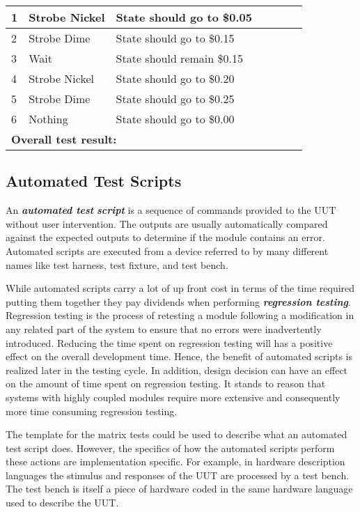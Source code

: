 \begin{table}[h]
\begin{tabular}{|m{1cm}|m{2cm}|m{2cm}|m{0.5cm}|m{0.5cm}|m{0.5cm}|m{2cm}|m{2cm}|}
1 & Strobe Nickel & State should go to \$0.05 & & & & \multicolumn{2}{l|}{} \\ \hline
2 & Strobe Dime & State should go to \$0.15 & & & & \multicolumn{2}{l|}{}\\ \hline
3 & Wait & State should remain \$0.15 & & & & \multicolumn{2}{l|}{}\\ \hline
4 & Strobe Nickel & State should go to \$0.20 & & & & \multicolumn{2}{l|}{}\\ \hline
5 & Strobe Dime & State should go to \$0.25 & & & & \multicolumn{2}{l|}{}\\ \hline
6 & Nothing & State should go to \$0.00 & & & & \multicolumn{2}{l|}{}\\ \hline
\multicolumn{3}{|l|}{\textbf{Overall test result:}} &   &  &  & \multicolumn{2}{l|}{}\\ \hline
\end{tabular}
\end{table}


\subsection*{Automated Test Scripts}
\label{subsection:automated-test-scripts}

An \emph{\textbf{automated test}} \emph{\textbf{script}} is a sequence
of commands provided to the UUT without user intervention. The outputs
are usually automatically compared against the expected outputs to
determine if the module contains an error. Automated scripts are
executed from a device referred to by many different names like test
harness, test fixture, and test bench.

While automated scripts carry a lot of up front cost in terms of the
time required putting them together they pay dividends when performing
\emph{\textbf{regression testing}}. Regression testing is the process of
retesting a module following a modification in any related part of the
system to ensure that no errors were inadvertently introduced. Reducing
the time spent on regression testing will has a positive effect on the
overall development time. Hence, the benefit of automated scripts is
realized later in the testing cycle. In addition, design decision can
have an effect on the amount of time spent on regression testing. It
stands to reason that systems with highly coupled modules require more
extensive and consequently more time consuming regression testing.

The template for the matrix tests could be used to describe what an
automated test script does. However, the specifics of how the automated
scripts perform these actions are implementation specific. For example,
in hardware description languages the stimulus and responses of the UUT
are processed by a test bench. The test bench is itself a piece of
hardware coded in the same hardware language used to describe the UUT.

